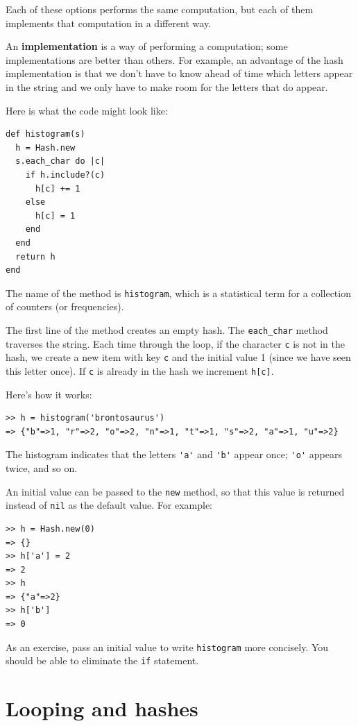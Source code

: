 \documentclass[10pt]{book}
\begin{document}
Each of these options performs the same computation, but each
of them implements that computation in a different way.

An {\bf implementation} is a way of performing a computation;
some implementations are better than others.  For example,
an advantage of the hash implementation is that we don't
have to know ahead of time which letters appear in the string
and we only have to make room for the letters that do appear.

Here is what the code might look like:

\begin{verbatim}
def histogram(s)
  h = Hash.new
  s.each_char do |c|
    if h.include?(c)
      h[c] += 1
    else
      h[c] = 1
    end
  end
  return h
end
\end{verbatim}
%
The name of the method is {\tt histogram}, which is a statistical
term for a collection of counters (or frequencies).

The first line of the
method creates an empty hash.  The {\tt each\_char} method traverses
the string.  Each time through the loop, if the character {\tt c} is
not in the hash, we create a new item with key {\tt c} and the
initial value 1 (since we have seen this letter once).  If {\tt c} is
already in the hash we increment {\tt h[c]}.

Here's how it works:

\begin{verbatim}
>> h = histogram('brontosaurus')
=> {"b"=>1, "r"=>2, "o"=>2, "n"=>1, "t"=>1, "s"=>2, "a"=>1, "u"=>2}
\end{verbatim}
%
The histogram indicates that the letters \verb"'a'" and \verb"'b'"
appear once; \verb"'o'" appears twice, and so on.


An initial value can be passed to the {\tt new} method,
so that this value is returned instead of {\tt nil}
as the default value. For example:

\begin{verbatim}
>> h = Hash.new(0)
=> {}
>> h['a'] = 2
=> 2
>> h
=> {"a"=>2}
>> h['b']
=> 0
\end{verbatim}
%
As an exercise, pass an initial value to write {\tt histogram} more concisely.  You
should be able to eliminate the {\tt if} statement.


\section{Looping and hashes}
\end{document}

